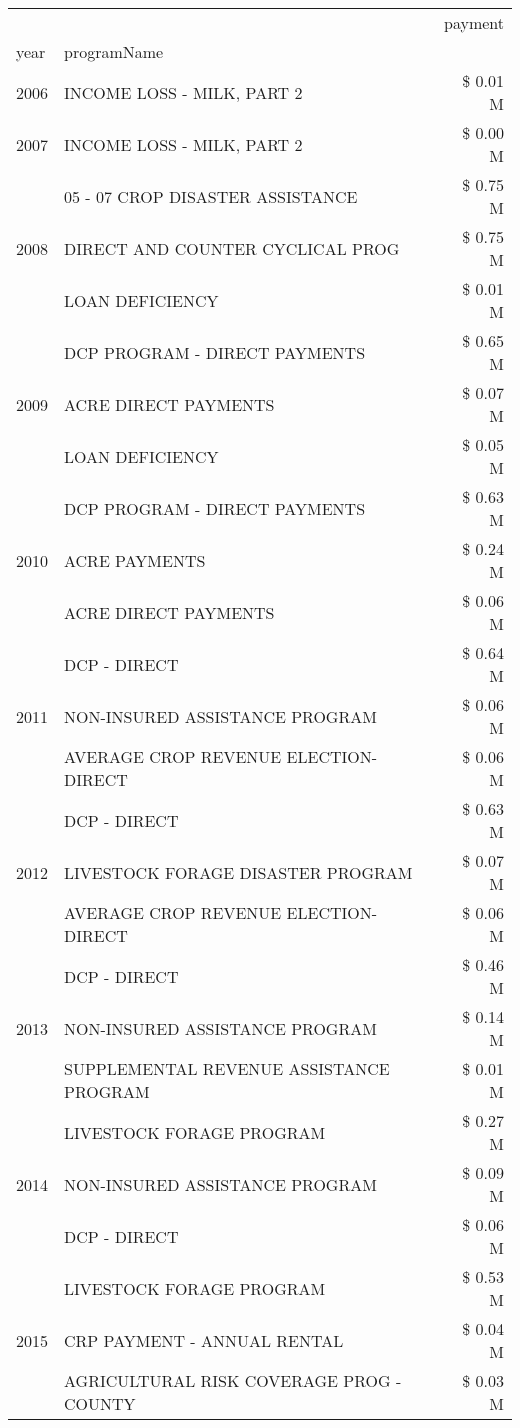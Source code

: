 \begin{tabular}{llr}
\toprule
 &  & payment \\
year & programName &  \\
\midrule
2006 & INCOME LOSS - MILK, PART 2 & \$ 0.01 M \\
\cline{1-3}
2007 & INCOME LOSS - MILK, PART 2 & \$ 0.00 M \\
\cline{1-3}
\multirow[t]{3}{*}{2008} & 05 - 07 CROP DISASTER ASSISTANCE & \$ 0.75 M \\
 & DIRECT AND COUNTER CYCLICAL PROG & \$ 0.75 M \\
 & LOAN DEFICIENCY & \$ 0.01 M \\
\cline{1-3}
\multirow[t]{3}{*}{2009} & DCP PROGRAM - DIRECT PAYMENTS & \$ 0.65 M \\
 & ACRE DIRECT PAYMENTS & \$ 0.07 M \\
 & LOAN DEFICIENCY & \$ 0.05 M \\
\cline{1-3}
\multirow[t]{3}{*}{2010} & DCP PROGRAM - DIRECT PAYMENTS & \$ 0.63 M \\
 & ACRE PAYMENTS & \$ 0.24 M \\
 & ACRE DIRECT PAYMENTS & \$ 0.06 M \\
\cline{1-3}
\multirow[t]{3}{*}{2011} & DCP - DIRECT & \$ 0.64 M \\
 & NON-INSURED ASSISTANCE PROGRAM & \$ 0.06 M \\
 & AVERAGE CROP REVENUE ELECTION-DIRECT & \$ 0.06 M \\
\cline{1-3}
\multirow[t]{3}{*}{2012} & DCP - DIRECT & \$ 0.63 M \\
 & LIVESTOCK FORAGE DISASTER PROGRAM & \$ 0.07 M \\
 & AVERAGE CROP REVENUE ELECTION-DIRECT & \$ 0.06 M \\
\cline{1-3}
\multirow[t]{3}{*}{2013} & DCP - DIRECT & \$ 0.46 M \\
 & NON-INSURED ASSISTANCE PROGRAM & \$ 0.14 M \\
 & SUPPLEMENTAL REVENUE ASSISTANCE PROGRAM & \$ 0.01 M \\
\cline{1-3}
\multirow[t]{3}{*}{2014} & LIVESTOCK FORAGE PROGRAM & \$ 0.27 M \\
 & NON-INSURED ASSISTANCE PROGRAM & \$ 0.09 M \\
 & DCP - DIRECT & \$ 0.06 M \\
\cline{1-3}
\multirow[t]{3}{*}{2015} & LIVESTOCK FORAGE PROGRAM & \$ 0.53 M \\
 & CRP PAYMENT - ANNUAL RENTAL & \$ 0.04 M \\
 & AGRICULTURAL RISK COVERAGE PROG - COUNTY & \$ 0.03 M \\

\end{tabular}
